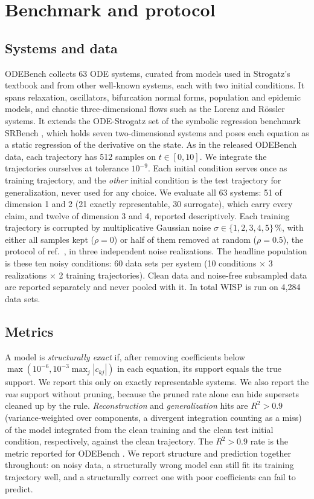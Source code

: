 \documentclass[10pt]{article}
\begin{document}
\section{Benchmark and protocol}\label{sec:protocol}

\subsection{Systems and data}
ODEBench \cite{dascoli2024} collects 63 ODE systems, curated from models used in Strogatz's textbook
\cite{strogatz2015} and from other well-known systems, each with two initial conditions. It spans relaxation, oscillators, bifurcation normal forms, population and epidemic
models, and chaotic three-dimensional flows such as the Lorenz and R\"ossler systems. It extends the ODE-Strogatz set
of the symbolic regression benchmark SRBench \cite{lacava2021}, which holds seven two-dimensional systems and poses each
equation as a static regression of the derivative on the state. As in the released ODEBench
data, each trajectory has 512 samples on $t\in[0,10]$. We integrate the trajectories ourselves at
tolerance $10^{-9}$. Each initial condition serves once as training trajectory, and the \emph{other} initial condition is the
test trajectory for generalization, never used for any choice. We evaluate all 63 systems: 51 of dimension 1 and 2 (21
exactly representable, 30 surrogate), which carry every claim, and twelve of dimension 3 and 4, reported descriptively.
Each training trajectory is corrupted by multiplicative Gaussian noise $\sigma\in\{1,2,3,4,5\}\,\%$, with either all
samples kept ($\rho=0$) or half of them removed at random ($\rho=0.5$), the protocol of ref.~\cite{dascoli2024}, in
three independent noise realizations. The headline population is these ten noisy conditions: 60 data sets per system
(10 conditions $\times$ 3 realizations $\times$ 2 training trajectories). Clean data and noise-free subsampled data are
reported separately and never pooled with it. In total WISP is run on 4,284 data sets.

\subsection{Metrics}
A model is \emph{structurally exact} if, after removing coefficients below $\max(10^{-6},10^{-3}\max_j|c_{kj}|)$ in
each equation, its support equals the true support. We report this only on exactly representable systems. We also
report the \emph{raw} support without pruning, because the pruned rate alone can hide supersets cleaned up by the rule.
\emph{Reconstruction} and \emph{generalization} hits are $R^2>0.9$ (variance-weighted over components, a divergent
integration counting as a miss) of the model integrated from the clean training and the clean test initial condition,
respectively, against the clean trajectory. The $R^2>0.9$ rate is the metric reported for ODEBench \cite{dascoli2024}.
We report structure and prediction together throughout: on noisy data, a structurally wrong model can still fit its
training trajectory well, and a structurally correct one with poor coefficients can fail to predict.
\end{document}
